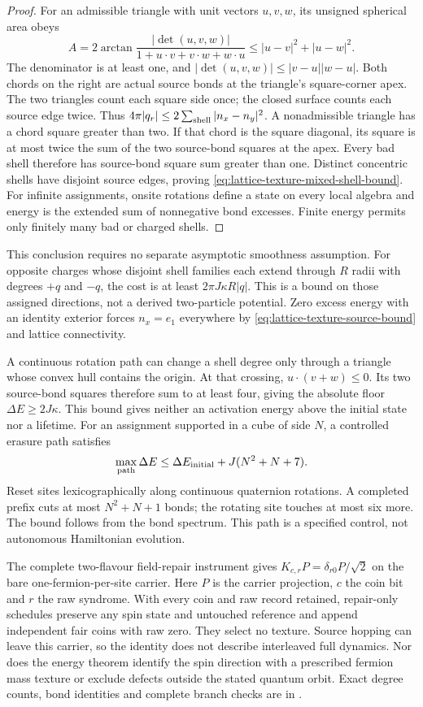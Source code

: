 \begin{proof}
For an admissible triangle with unit vectors $u,v,w$, its unsigned
spherical area obeys
\[
 A=2\arctan\frac{|\det(u,v,w)|}{1+u\cdot v+v\cdot w+w\cdot u}
   \leq |u-v|^2+|u-w|^2.
\]
The denominator is at least one, and
$|\det(u,v,w)|\leq|v-u||w-u|$.
Both chords on the right are actual source bonds at the triangle's
square-corner apex. The two triangles count each square side once;
the closed surface counts each source edge twice. Thus
$4\pi|q_r|\leq2\sum_{\rm shell}|n_x-n_y|^2$.
A nonadmissible triangle has a chord square greater than two.
If that chord is the square diagonal, its square is at most twice the
sum of the two source-bond squares at the apex. Every bad shell
therefore has source-bond square sum greater than one.
Distinct concentric shells have disjoint source edges, proving
\eqref{eq:lattice-texture-mixed-shell-bound}.
For infinite assignments, onsite rotations define a state on every local
algebra and energy is the extended sum of nonnegative bond excesses.
Finite energy permits only finitely many bad or charged shells.
\end{proof}

This conclusion requires no separate asymptotic smoothness assumption.
For opposite charges whose disjoint shell families each extend through
$R$ radii with degrees $+q$ and $-q$, the cost is at least
$2\pi J\kappa R|q|$. This is a bound on those assigned directions, not
a derived two-particle potential. Zero excess energy with an identity
exterior forces $n_x=e_1$ everywhere by
\eqref{eq:lattice-texture-source-bound} and lattice connectivity.

A continuous rotation path can change a shell degree only through a
triangle whose convex hull contains the origin. At that crossing,
$u\cdot(v+w)\leq0$. Its two source-bond squares therefore sum to at least
four, giving the absolute floor $\Delta E\geq2J\kappa$. This bound gives
neither an activation energy above the initial state nor a lifetime.
For an assignment supported in a cube of side $N$, a controlled erasure
path satisfies
\[
 \max_{\rm path}\Delta E
 \leq\Delta E_{\rm initial}+J(N^2+N+7).
\]
Reset sites lexicographically along continuous quaternion rotations.
A completed prefix cuts at most $N^2+N+1$ bonds; the rotating site touches
at most six more. The bound follows from the bond spectrum. This path
is a specified control, not autonomous Hamiltonian evolution.

The complete two-flavour field-repair instrument gives
$K_{c,r}P=\delta_{r0}P/\sqrt2$ on the bare one-fermion-per-site carrier.
Here $P$ is the carrier projection, $c$ the coin bit and $r$ the raw syndrome.
With every coin and raw record retained, repair-only schedules preserve
any spin state and untouched reference and append independent fair
coins with raw zero. They select no texture. Source hopping can leave
this carrier, so the identity does not describe interleaved full dynamics.
Nor does the energy theorem identify the spin direction with a prescribed
fermion mass texture or exclude defects outside the stated quantum orbit.
Exact degree counts, bond identities and complete branch checks are in
.
